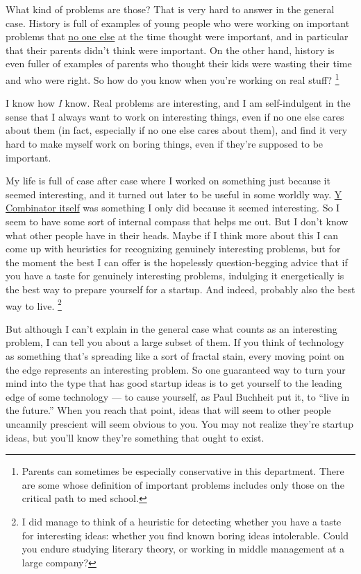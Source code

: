 \documentclass[12pt]{book}
\begin{document}
What kind of problems are those? That is very hard to answer in the
general case. History is full of examples of young people who were
working on important problems that \href{marginal.html}{no one else} at
the time thought were important, and in particular that their parents
didn't think were important. On the other hand, history is even fuller
of examples of parents who thought their kids were wasting their time
and who were right. So how do you know when you're working on real
stuff? \footnote{Parents can sometimes be especially conservative in this
department. There are some whose definition of important problems
includes only those on the critical path to med school.}

I know how \emph{I} know. Real problems are interesting, and I am
self-indulgent in the sense that I always want to work on interesting
things, even if no one else cares about them (in fact, especially if no
one else cares about them), and find it very hard to make myself work on
boring things, even if they're supposed to be important.

My life is full of case after case where I worked on something just
because it seemed interesting, and it turned out later to be useful in
some worldly way. \href{http://ycombinator.com/start.html}{Y Combinator
itself} was something I only did because it seemed interesting. So I
seem to have some sort of internal compass that helps me out. But I
don't know what other people have in their heads. Maybe if I think more
about this I can come up with heuristics for recognizing genuinely
interesting problems, but for the moment the best I can offer is the
hopelessly question-begging advice that if you have a taste for
genuinely interesting problems, indulging it energetically is the best
way to prepare yourself for a startup. And indeed, probably also the
best way to live. \footnote{I did manage to think of a heuristic for detecting whether you
have a taste for interesting ideas: whether you find known boring ideas
intolerable. Could you endure studying literary theory, or working in
middle management at a large company?}

But although I can't explain in the general case what counts as an
interesting problem, I can tell you about a large subset of them. If you
think of technology as something that's spreading like a sort of fractal
stain, every moving point on the edge represents an interesting problem.
So one guaranteed way to turn your mind into the type that has good
startup ideas is to get yourself to the leading edge of some technology
--- to cause yourself, as Paul Buchheit put it, to ``live in the
future.'' When you reach that point, ideas that will seem to other
people uncannily prescient will seem obvious to you. You may not realize
they're startup ideas, but you'll know they're something that ought to
exist.
\end{document}
